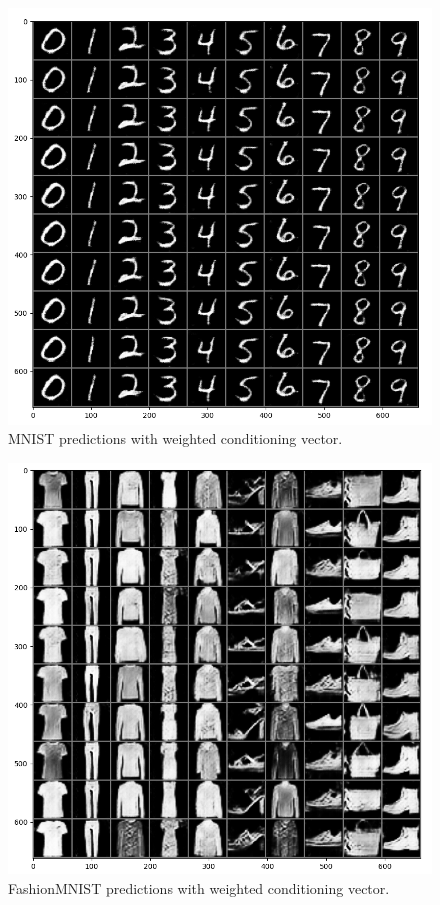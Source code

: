 \documentclass[10pt,twocolumn,letterpaper]{article}
\begin{document}
\begin{figure}
   \centering
   \includegraphics[scale=0.39]{images/mnist-weighted.png}
   \caption{MNIST predictions with weighted conditioning vector.}
   \label{fig:mnist-weight}
\end{figure}

\begin{figure}
   \centering
   \includegraphics[scale=0.39]{images/fashion-weighted.png}
   \caption{FashionMNIST predictions with weighted conditioning vector.}
   \label{fig:fashion-weight}
\end{figure}
\end{document}
